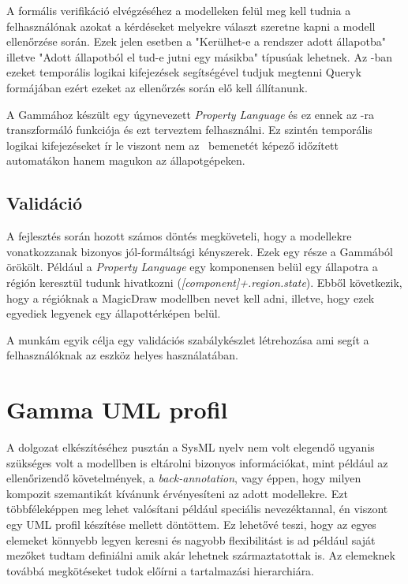 A formális verifikáció elvégzéséhez a modelleken felül meg kell tudnia a felhasználónak azokat a kérdéseket melyekre választ szeretne kapni a modell ellenőrzése során. Ezek jelen esetben a "Kerülhet-e a rendszer adott állapotba" illetve "Adott állapotból el tud-e jutni egy másikba" típusúak lehetnek. Az \uppaal-ban ezeket temporális logikai kifejezések segítségével tudjuk megtenni \uppaal Queryk formájában ezért ezeket az ellenőrzés során elő kell állítanunk.

A Gammához készült egy úgynevezett \emph{Property Language} és ez ennek az \uppaal-ra transzformáló funkciója és ezt terveztem felhasználni. Ez szintén temporális logikai kifejezéseket ír le viszont nem az \uppaal\ bemenetét képező időzített automatákon hanem magukon az állapotgépeken.

\subsection{Validáció}

A fejlesztés során hozott számos döntés megköveteli, hogy a modellekre vonatkozzanak bizonyos jól-formáltsági kényszerek. Ezek egy része a Gammából örökölt. Például a \emph{Property Language} egy komponensen belül egy állapotra a régión keresztül tudunk hivatkozni (\emph{[component]+.region.state}). Ebből következik, hogy a régióknak a MagicDraw modellben nevet kell adni, illetve, hogy ezek egyediek legyenek egy állapottérképen belül.

A munkám egyik célja egy validációs szabálykészlet létrehozása ami segít a felhasználóknak az eszköz helyes használatában.

\newpage

\section{Gamma UML profil}

A dolgozat elkészítéséhez pusztán a SysML nyelv nem volt elegendő ugyanis szükséges volt  a modellben is eltárolni  bizonyos információkat, mint például az ellenőrizendő követelmények, a  \emph{back-annotation}, vagy éppen, hogy milyen kompozit szemantikát kívánunk érvényesíteni az adott modellekre. Ezt többféleképpen meg lehet valósítani például speciális nevezéktannal, én viszont egy UML profil készítése mellett döntöttem. Ez lehetővé teszi, hogy az egyes elemeket könnyebb legyen keresni és nagyobb flexibilitást is ad például saját mezőket tudtam definiálni amik akár lehetnek származtatottak is. Az elemeknek továbbá megkötéseket tudok előírni a tartalmazási hierarchiára.

